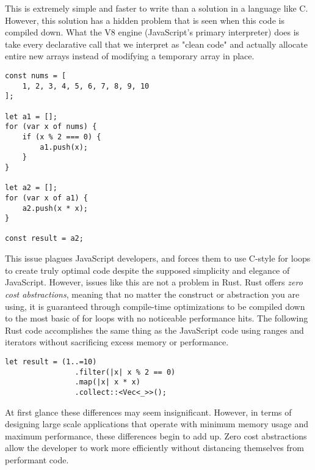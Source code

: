 \begin{multicols}{2}
This is extremely simple and faster to write than a solution in a language like C. However, this solution has a hidden
problem that is seen when this code is compiled down. What the V8 engine (JavaScript's primary interpreter) does is take
every declarative call that we interpret as "clean code" and actually allocate entire new arrays instead of modifying
a temporary array in place.

\vspace{\baselineskip}
\noindent
\begin{minipage}[]{\linewidth}
\begin{verbatim}
const nums = [
    1, 2, 3, 4, 5, 6, 7, 8, 9, 10
];

let a1 = [];
for (var x of nums) {
    if (x % 2 === 0) {
        a1.push(x);
    }
}

let a2 = [];
for (var x of a1) {
    a2.push(x * x);
}

const result = a2;
\end{verbatim}
\end{minipage}
\vspace{\baselineskip}

This issue plagues JavaScript developers, and forces them to use C-style for loops to create truly optimal code despite
the supposed simplicity and elegance of JavaScript. However, issues like this are not a problem in Rust. Rust offers
\textit{zero cost abstractions}, meaning that no matter the construct or abstraction you are using, it is guaranteed
through compile-time optimizations to be compiled down to the most basic of for loops with no noticeable performance
hits. The following Rust code accomplishes the same thing as the JavaScript code using ranges and iterators without
sacrificing excess memory or performance.

\vspace{\baselineskip}
\noindent
\begin{minipage}[]{\linewidth}
\begin{verbatim}
let result = (1..=10)
                .filter(|x| x % 2 == 0)
                .map(|x| x * x)
                .collect::<Vec<_>>();
\end{verbatim}
\end{minipage}
\vspace{\baselineskip}

At first glance these differences may seem insignificant. However, in terms of designing large scale applications that
operate with minimum memory usage and maximum performance, these differences begin to add up. Zero cost abstractions
allow the developer to work more efficiently without distancing themselves from performant code.


\end{multicols}

